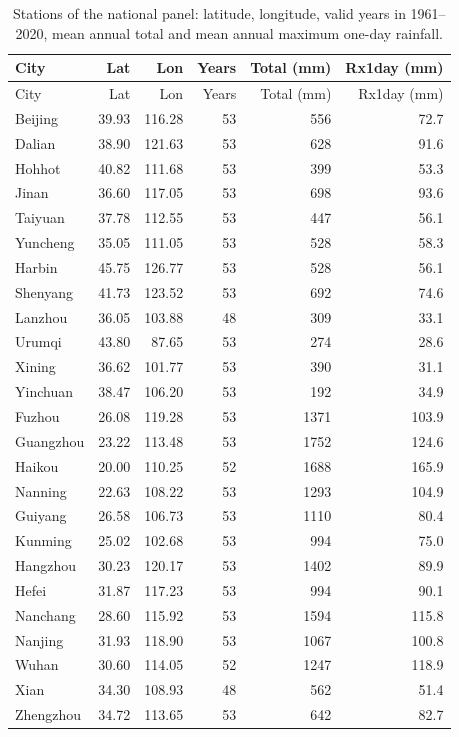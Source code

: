 \begin{longtable}{lrrrrr}
\caption{Stations of the national panel: latitude, longitude, valid years in 1961--2020, mean annual total and mean annual maximum one-day rainfall.}\label{tab:stations}\\
\toprule
City & Lat & Lon & Years & Total (mm) & Rx1day (mm)\\
\midrule
\endfirsthead
\toprule
City & Lat & Lon & Years & Total (mm) & Rx1day (mm)\\
\midrule
\endhead
\bottomrule
\endfoot
Beijing & 39.93 & 116.28 & 53 & 556 & 72.7 \\
Dalian & 38.90 & 121.63 & 53 & 628 & 91.6 \\
Hohhot & 40.82 & 111.68 & 53 & 399 & 53.3 \\
Jinan & 36.60 & 117.05 & 53 & 698 & 93.6 \\
Taiyuan & 37.78 & 112.55 & 53 & 447 & 56.1 \\
Yuncheng & 35.05 & 111.05 & 53 & 528 & 58.3 \\
Harbin & 45.75 & 126.77 & 53 & 528 & 56.1 \\
Shenyang & 41.73 & 123.52 & 53 & 692 & 74.6 \\
Lanzhou & 36.05 & 103.88 & 48 & 309 & 33.1 \\
Urumqi & 43.80 & 87.65 & 53 & 274 & 28.6 \\
Xining & 36.62 & 101.77 & 53 & 390 & 31.1 \\
Yinchuan & 38.47 & 106.20 & 53 & 192 & 34.9 \\
Fuzhou & 26.08 & 119.28 & 53 & 1371 & 103.9 \\
Guangzhou & 23.22 & 113.48 & 53 & 1752 & 124.6 \\
Haikou & 20.00 & 110.25 & 52 & 1688 & 165.9 \\
Nanning & 22.63 & 108.22 & 53 & 1293 & 104.9 \\
Guiyang & 26.58 & 106.73 & 53 & 1110 & 80.4 \\
Kunming & 25.02 & 102.68 & 53 & 994 & 75.0 \\
Hangzhou & 30.23 & 120.17 & 53 & 1402 & 89.9 \\
Hefei & 31.87 & 117.23 & 53 & 994 & 90.1 \\
Nanchang & 28.60 & 115.92 & 53 & 1594 & 115.8 \\
Nanjing & 31.93 & 118.90 & 53 & 1067 & 100.8 \\
Wuhan & 30.60 & 114.05 & 52 & 1247 & 118.9 \\
Xian & 34.30 & 108.93 & 48 & 562 & 51.4 \\
Zhengzhou & 34.72 & 113.65 & 53 & 642 & 82.7 \\
\end{longtable}
